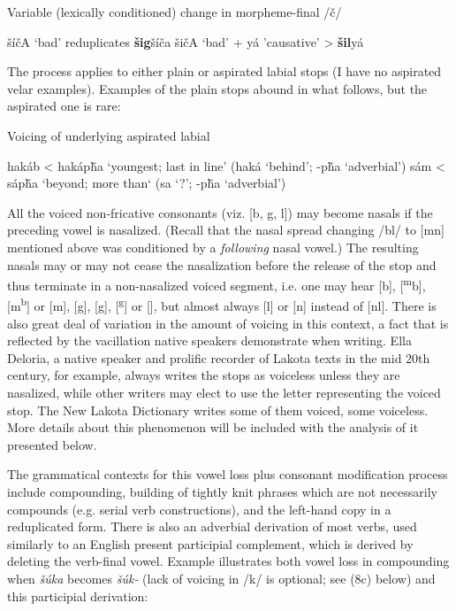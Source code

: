 \documentclass[output=paper]{LSP/langsci}
\begin{document}
\begin{exe}\label{ex:rood:5}
\ex Variable (lexically conditioned) change in morpheme-final /\v{c}/
\begin{xlist}
\ex \v{s}\'i\v{c}A `bad' reduplicates \textbf{\v{s}ig}\v{s}\'i\v{c}a
\ex \v{s}i\v{c}A `bad' + y\'a 'causative' > \textbf{\v{s}il}y\'a
\end{xlist}
\end{exe}

The process applies to either plain or aspirated labial stops (I have no aspirated velar examples). Examples of the plain stops abound in what follows, but the aspirated one is rare:

\begin{exe}\label{ex:rood:6}
\ex Voicing of underlying aspirated labial
\begin{xlist}
\ex hak\'ab < hak\'ap\v{h}a `youngest; last in line' (hak\'a `behind'; -p\v{h}a `adverbial')
\ex s\'am < s\'ap\v{h}a `beyond; more than` (sa `?'; -p\v{h}a `adverbial')
\end{xlist}
\end{exe}

All the voiced non-fricative consonants (viz. [b, g, l]) may become nasals if the preceding vowel is nasalized. (Recall that the nasal spread changing /bl/ to [mn] mentioned above was conditioned by a \textit{following} nasal vowel.) The resulting nasals may or may not cease the nasalization before the release of the stop and thus terminate in a non-nasalized voiced segment, i.e. one may hear [b], [\textsuperscript{m}b], [m\textsuperscript{b}] or [m], [g], [\textsuperscript{}g], [\textsuperscript{g}] or [], but almost always [l] or [n] instead of [nl]. There is also great deal of variation in the amount of voicing in this context, a fact that is reflected by the vacillation native speakers demonstrate when writing. Ella Deloria, a native speaker and prolific recorder of Lakota texts in the mid 20th century, for example, always writes the stops as voiceless unless they are nasalized, while other writers may elect to use the letter representing the voiced stop. The New Lakota Dictionary writes some of them voiced, some voiceless. More details about this phenomenon will be included with the analysis of it presented below.

The grammatical contexts for this vowel loss plus consonant modification process include compounding, building of tightly knit phrases which are not necessarily compounds (e.g. serial verb constructions), and the left-hand copy in a reduplicated form. There is also an adverbial derivation of most verbs, used similarly to an English present participial complement, which is derived by deleting the verb-final vowel. Example  illustrates both vowel loss in compounding when \textit{\v{s}\'uka} becomes \textit{\v{s}\'uk-} (lack of voicing in /k/ is optional; see (8c) below) and this participial derivation:
\end{document}
